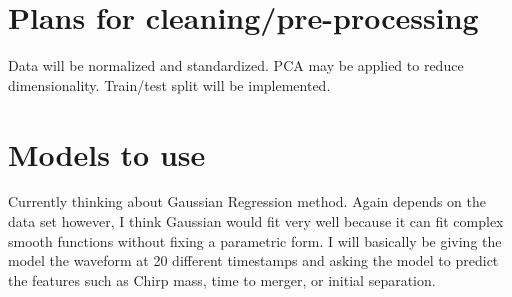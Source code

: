 \documentclass[12pt]{article}
\begin{document}
\section{Plans for cleaning/pre-processing}
Data will be normalized and standardized. PCA may be applied to reduce dimensionality. Train/test split will be implemented.

\section{Models to use}
Currently thinking about Gaussian Regression method. Again depends on the data set however, I think Gaussian would fit very well because it can fit complex smooth functions without fixing a parametric form. 
I will basically be giving the model the waveform at 20 different timestamps and asking the model to predict the features such as Chirp mass, time to merger, or initial separation.
\end{document}

